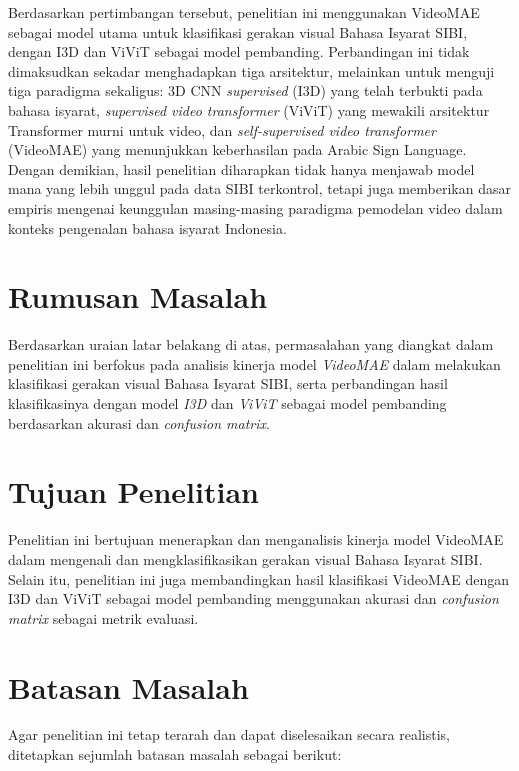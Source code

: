 Berdasarkan pertimbangan tersebut, penelitian ini menggunakan VideoMAE sebagai model utama untuk klasifikasi gerakan visual Bahasa Isyarat SIBI, dengan I3D dan ViViT sebagai model pembanding. Perbandingan ini tidak dimaksudkan sekadar menghadapkan tiga arsitektur, melainkan untuk menguji tiga paradigma sekaligus: 3D CNN \textit{supervised} (I3D) yang telah terbukti pada bahasa isyarat, \textit{supervised video transformer} (ViViT) yang mewakili arsitektur Transformer murni untuk video, dan \textit{self-supervised video transformer} (VideoMAE) yang menunjukkan keberhasilan pada Arabic Sign Language. Dengan demikian, hasil penelitian diharapkan tidak hanya menjawab model mana yang lebih unggul pada data SIBI terkontrol, tetapi juga memberikan dasar empiris mengenai keunggulan masing-masing paradigma pemodelan video dalam konteks pengenalan bahasa isyarat Indonesia.\par


\section{Rumusan Masalah} \label{I.Rumusan Masalah}
Berdasarkan uraian latar belakang di atas, permasalahan yang diangkat dalam penelitian ini berfokus pada analisis kinerja model \textit{VideoMAE} dalam melakukan klasifikasi gerakan visual Bahasa Isyarat SIBI, serta perbandingan hasil klasifikasinya dengan model \textit{I3D} dan \textit{ViViT} sebagai model pembanding berdasarkan akurasi dan \textit{confusion matrix}.\par


\section{Tujuan Penelitian} \label{I.Tujuan}
Penelitian ini bertujuan menerapkan dan menganalisis kinerja model VideoMAE dalam mengenali dan mengklasifikasikan gerakan visual Bahasa Isyarat SIBI. Selain itu, penelitian ini juga membandingkan hasil klasifikasi VideoMAE dengan I3D dan ViViT sebagai model pembanding menggunakan akurasi dan \textit{confusion matrix} sebagai metrik evaluasi.\par

\section{Batasan Masalah} \label{I.Batasan}
Agar penelitian ini tetap terarah dan dapat diselesaikan secara realistis, ditetapkan sejumlah batasan masalah sebagai berikut:

